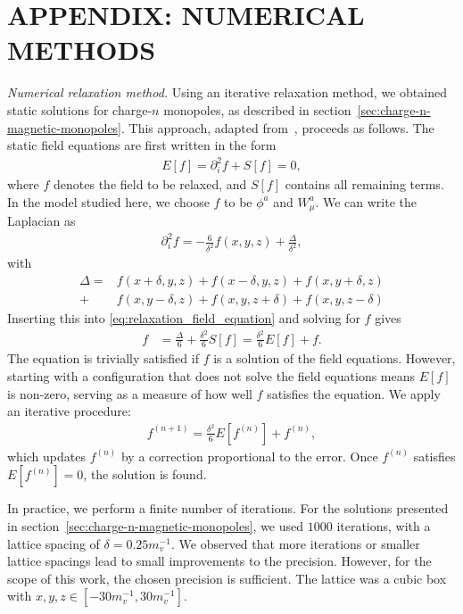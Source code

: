 \documentclass[aps, prd, twocolumn, superscriptaddress, preprintnumbers, nofootinbib, longbibliography]{revtex4-1}
\begin{document}
\section*{\MakeUppercase{Appendix: Numerical Methods}}
\label{sec:numerical-methods}
\textit{Numerical relaxation method.}
Using an iterative relaxation method, we obtained static solutions for charge-$n$ monopoles, as described in section~\ref{sec:charge-n-magnetic-monopoles}. This approach, adapted from~\cite{Saurabh:2017ryg, Patel:2023sfm}, proceeds as follows. The static field equations are first written in the form
\begin{align} 
    \label{eq:relaxation_field_equation} 
    E[f] = \partial_i^2 f + S[f] = 0, 
\end{align} 
where $f$ denotes the field to be relaxed, and $S[f]$ contains all remaining terms. In the model studied here, we choose $f$ to be $\phi^a$ and $W_\mu^a$.
We can write the Laplacian as
\begin{align*}
    \partial_i^2 f=-\frac{6}{\delta^2}f(x,y,z)+\frac{\Delta}{\delta^2},
\end{align*}
with
\begin{align*}
    \Delta=&f(x+\delta,y,z)+f(x-\delta,y,z)+f(x,y+\delta,z)\\
    +&f(x,y-\delta,z)+f(x,y,z+\delta)+f(x,y,z-\delta)
\end{align*}
Inserting this into \eqref{eq:relaxation_field_equation} and solving for $f$ gives
\begin{align*}
    f&=\frac{\Delta}{6}+\frac{\delta^2}{6}S[f]=\frac{\delta^2}{6}E[f]+f.
\end{align*}
The equation is trivially satisfied if $f$ is a solution of the field equations. However, starting with a configuration that does not solve the field equations means $E[f]$ is non-zero, serving as a measure of how well $f$ satisfies the equation. We apply an iterative procedure:
\begin{align} 
    f^{(n+1)} = \frac{\delta^2}{6} E[f^{(n)}] +f^{(n)}, 
\end{align}
which updates $f^{(n)}$ by a correction proportional to the error. Once $f^{(n)}$ satisfies $E[f^{(n)}] = 0$, the solution is found.

In practice, we perform a finite number of iterations. For the solutions presented in section~\ref{sec:charge-n-magnetic-monopoles}, we used $1000$ iterations, with a lattice spacing of $\delta = 0.25 m_v^{-1}$. We observed that more iterations or smaller lattice spacings lead to small improvements to the precision. However, for the scope of this work, the chosen precision is sufficient.
The lattice was a cubic box with $x, y, z \in [-30 m_v^{-1}, 30 m_v^{-1}]$.
\end{document}

